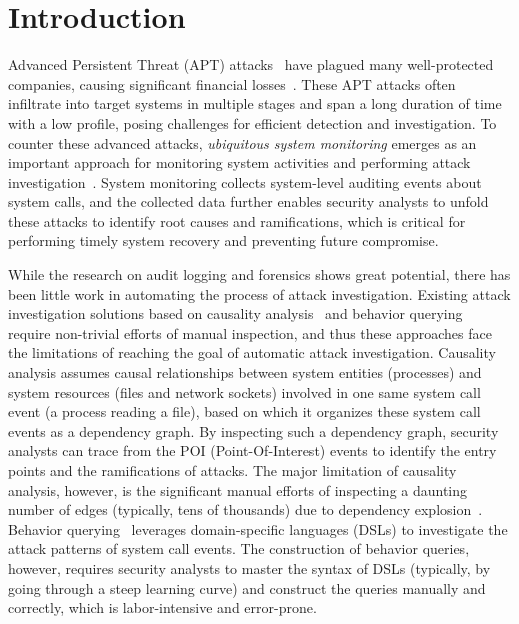 \section{Introduction}

Advanced Persistent Threat (APT) attacks~\cite{fireeye:anatomy,aptsymantec} have plagued many well-protected companies, causing significant financial losses~\cite{ebay,opm,target,homedepot,ya:yahooleak,equifax,marriott}.
These APT attacks often infiltrate into target systems in multiple stages 
and span a long duration of time with a low profile, posing challenges for efficient detection and investigation.
To counter these advanced attacks, \emph{ubiquitous system monitoring} emerges as an important approach for monitoring system activities and performing attack investigation~\cite{backtracking,backtracking2,wormlog,logtracking,mcitracking,liu2018priotracker,hassan2019nodoze,gao2018aiql,gao2018saql}.
System monitoring collects system-level auditing events about system calls,
and the collected data further enables security analysts to unfold these attacks to identify root causes and ramifications, which is critical for performing timely system recovery and preventing future compromise.

While the research on audit logging and forensics shows great potential, there has been little work in automating the process of attack investigation. Existing attack investigation solutions based on causality analysis~\cite{backtracking,backtracking2,taser,intrusionrecovery,liu2018priotracker} and behavior querying~\cite{gao2018aiql,gao2018saql} require non-trivial efforts of manual inspection, and thus these approaches face the limitations of reaching the goal of automatic attack investigation.
%
Causality analysis assumes causal relationships between system entities (\eg processes) and system resources (\eg files and network sockets) involved in one same system call event (\eg a process reading a file), based on which it 
organizes these system call events as a dependency graph.
By inspecting such a dependency graph, security analysts can trace from the POI (Point-Of-Interest) events to identify the entry points and the ramifications of attacks.
The major limitation of causality analysis, however, is the significant manual efforts of inspecting a daunting number of edges (typically, tens of thousands) due to dependency explosion~\cite{beep,reduction,reduction2}.
%
Behavior querying~\cite{gao2018aiql,gao2018saql} leverages domain-specific languages (DSLs) to investigate the attack patterns of system call events. The construction of behavior queries, however, requires security analysts to master the syntax of DSLs (typically, by going through a steep learning curve) and construct the queries manually and correctly, which is labor-intensive and error-prone.


